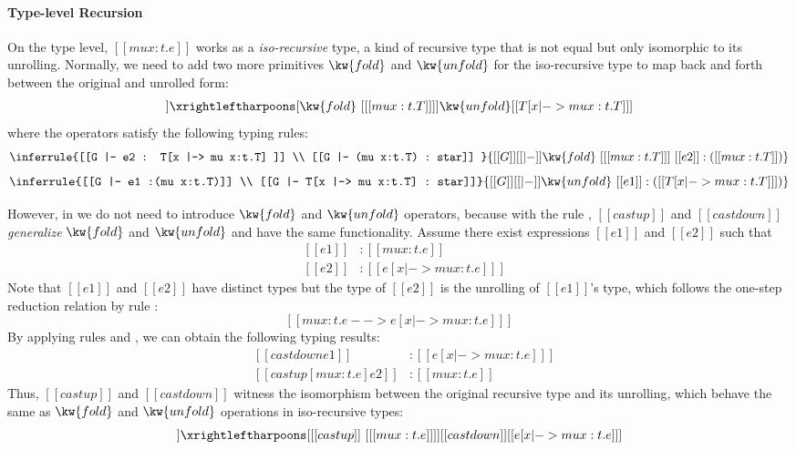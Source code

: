 \paragraph{Type-level Recursion}

On the type level, $[[mu x:t.e]]$ works as a \emph{iso-recursive}
type, a kind of recursive type that is not equal but only isomorphic
to its unrolling. Normally, we need to add two more primitives
$\kw{fold}$ and $\kw{unfold}$ for the iso-recursive type to map back
and forth between the original and unrolled form:
\begin{align*}
  [[mu x:t.T]] \xrightleftharpoons[{\kw{fold}~[ [[mu x:t.T]]
  ]}]{\kw{unfold}} [[T[x |-> mu x:t.T] ]]
\end{align*}
where the operators satisfy the following typing rules:
\[ \inferrule{[[G |- e2 : T[x |-> mu x:t.T] ]] \\ [[G |- (mu x:t.T) : star]] }
   {[[G]] [[|-]] \kw{fold}~[ [[mu x:t.T]] ]~[[e2]] : ([[mu x:t.T]])} \]
\[ \inferrule{[[G |- e1 :(mu x:t.T)]] \\ [[G |- T[x |-> mu x:t.T] : star]]}
   {[[G]] [[|-]] \kw{unfold}~[[e1]] : ([[T[x |-> mu x:t.T] ]])} \]

However, in \name we do not need to introduce $\kw{fold}$ and
$\kw{unfold}$ operators, because with the rule ,
$[[castup]]$ and $[[castdown]]$ \emph{generalize} $\kw{fold}$ and
$\kw{unfold}$ and have the same functionality. Assume there exist
expressions $[[e1]]$ and $[[e2]]$ such that
\[\begin{array}{lll}
	&[[e1]] &: [[mu x:t.e]]\\
	&[[e2]] &: [[e [x |-> mu x:t.e] ]]
\end{array}\]
Note that $[[e1]]$ and $[[e2]]$ have distinct types but the type of $[[e2]]$ is
the unrolling of $[[e1]]$'s type, which follows the one-step reduction relation
by rule :
\[ [[mu x:t.e --> e [x |-> mu x:t.e] ]] \]
By applying rules  and , we can obtain
the following typing results:
\[\begin{array}{lll}
	&[[castdown e1]] &: [[e [x |-> mu x:t.e] ]]\\
	&[[castup [mu x:t.e] e2]] &: [[mu x:t.e]]
\end{array}\]
Thus, $[[castup]]$ and $[[castdown]]$ witness the isomorphism between the
original recursive type and its unrolling, which behave the same as $\kw{fold}$
and $\kw{unfold}$ operations in iso-recursive types:
\begin{align*}
  [[mu x:t.e]] \xrightleftharpoons[{[[castup]]~[ [[mu x:t.e]]
  ]}]{[[castdown]]} [[e[x |-> mu x:t.e] ]]
\end{align*}


